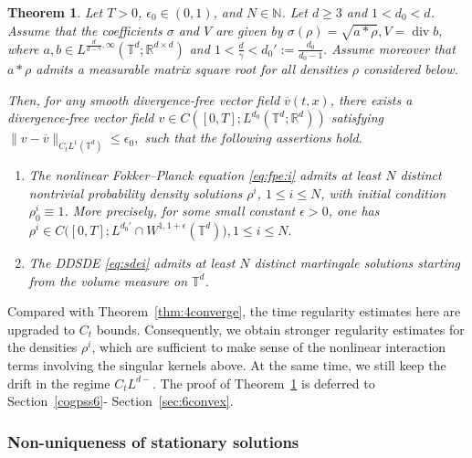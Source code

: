 \documentclass[UTF-8,reqno]{amsart}
\numberwithin{equation}{section}
\newtheorem{theorem}{Theorem}[section]
\theoremstyle{definition}
\def\geq{\geqslant}
\def\leq{\leqslant}
\def\bt{\begin{theorem}}
\def\et{\end{theorem}}
\def\geq{\geqslant}
\def\leq{\leqslant}
\begin{document}
\bt\label{thm:6converge}
Let $T>0$, $\epsilon_0\in(0,1)$, and $N\in\mathbb{N}$. Let $d\geq 3$ and
$1<d_0<d$. Assume that the coefficients $\sigma$ and $V$ are given by
$\sigma(\rho)=\sqrt{a*\rho},
V=\operatorname{div} b,$
where $a,b\in L^{\frac{d}{d-\gamma},\infty}
(\mathbb{T}^d;\mathbb{R}^{d\times d})$ and
$
1<\frac{d}{\gamma}<d_0':=\frac{d_0}{d_0-1}.
$  
Assume moreover that $a*\rho$ admits a measurable matrix square root for all
densities $\rho$ considered below.

Then, for any smooth divergence-free vector field
$\overline v(t,x)$, there exists a   divergence-free
vector field
$
v\in C ([0,T];L^{d_0}(\mathbb{T}^d;\mathbb{R}^d) )
$
satisfying $\|v-\overline v\|_{C_tL^1(\mathbb{T}^d)}
\leq \epsilon_0, $ 
such that the following assertions hold.

\begin{enumerate}
\item
The nonlinear Fokker--Planck equation \eqref{eq:fpe:i} admits at least $N$
distinct nontrivial probability density solutions $\rho^i$, $1\leq i\leq N$,
with initial condition $\rho^i_0\equiv 1$. More precisely, for some
small constant $\epsilon>0$, one has
$
\rho^i
\in
C\bigl([0,T];L^{d_0'}\cap W^{1,1+\epsilon}(\mathbb{T}^d)\bigr),
1\leq i\leq N .
$

\item
The DDSDE \eqref{eq:sdei} admits at least $N$ distinct martingale solutions
starting from the  volume measure on $\mathbb{T}^d$.
\end{enumerate}
\et

Compared with Theorem~\ref{thm:4converge}, the time regularity estimates here
are upgraded to $C_t$ bounds. Consequently, we obtain stronger regularity
estimates for the densities $\rho^i$, which are sufficient to make sense of
the nonlinear interaction terms involving the singular kernels above. At the same time, we still keep the drift in the 
regime $C_tL^{d-}$. The
proof of Theorem~\ref{thm:6converge} is deferred to
Section~\ref{cogpss6}- Section~\ref{sec:6convex}.

 

\subsubsection{Non-uniqueness of stationary solutions}
\end{document}
